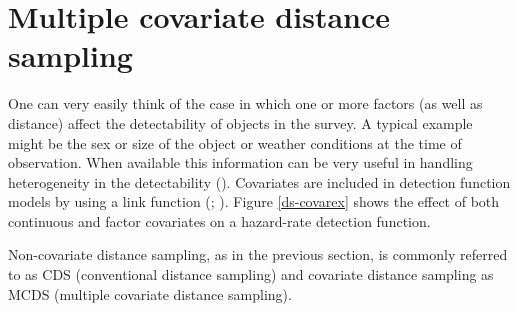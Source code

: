\section{Multiple covariate distance sampling}
\label{intro-ds-covar}

One can very easily think of the case in which one or more factors (as well as distance) affect the detectability of objects in the survey. A typical example might be the sex or size of the object or weather conditions at the time of observation. When available this information can be very useful in handling heterogeneity in the detectability (\cite[p. 88]{IDS}). Covariates are included in detection function models by using a link function (\cite{davidbthesis}; \cite{covpaper}\label{cor-7s10-2}\label{cor-8s3-1}). Figure \ref{ds-covarex} shows the effect of both continuous and factor covariates on a hazard-rate detection function.

Non-covariate distance sampling, as in the previous section, is commonly referred to as CDS (conventional distance sampling) and covariate distance sampling as MCDS (multiple covariate distance sampling).

